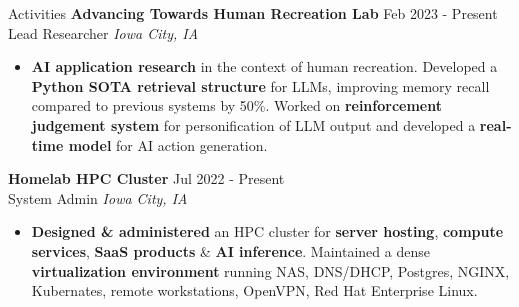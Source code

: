\documentclass{resume} %
\begin{document}
\begin{rSection}{Activities}
  \textbf{Advancing Towards Human Recreation Lab} \hfill Feb 2023 - Present\\
  Lead Researcher \hfill \textit{Iowa City, IA}
   \begin{itemize}
    \itemsep -3pt {} 
    \item \textbf{AI application research} in the context of human recreation.
    Developed a \textbf{Python SOTA retrieval structure} for LLMs, improving memory recall compared to previous systems by 50\%. Worked on \textbf{reinforcement judgement system} for personification of LLM output and developed a \textbf{real-time model} for AI action generation.
    \end{itemize}
    \textbf{Homelab HPC Cluster} \hfill Jul 2022 - Present\\
    System Admin \hfill \textit{Iowa City, IA}
     \begin{itemize}
      \itemsep -3pt {} 
      \item \textbf{Designed \& administered} an HPC cluster for \textbf{server hosting}, \textbf{compute services}, \textbf{SaaS products} \& \textbf{AI inference}. Maintained a dense \textbf{virtualization environment} running NAS, DNS/DHCP, Postgres, NGINX, Kubernates, remote workstations, OpenVPN, Red Hat Enterprise Linux.
      \end{itemize}
  
\end{rSection} 

\end{document}
